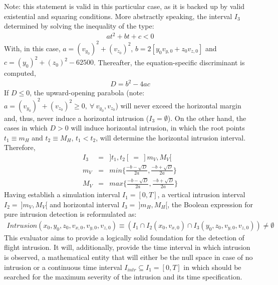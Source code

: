 \documentclass{article}
\begin{document}
\noindent
Note: this statement is valid in this particular case, as it is backed up by valid existential and squaring conditions. More abstractly speaking, the interval $I_3$ determined by solving the inequality of the type:
\begin{eqnarray*}
at^2 + bt+c<0
\end{eqnarray*}
\noindent
With, in this case, $a=(v_{y_0})^2+(v_{z_0})^2$, $b=2[y_0v_{y,0}+z_0 v_{z,0}]$ and $c=(y_0)^2 +(z_0)^2-62500$. Thereafter, the equation-specific discriminant is computed,
\begin{eqnarray*}
D = b^2-4ac
\end{eqnarray*}
\noindent
If $D\leq0$, the upward-opening parabola (note: $a=(v_{y_0})^2+(v_{z_0})^2\geq0, \ \forall \ v_{y_0},v_{z_0}$) will never exceed the horizontal margin and, thus, never induce a horizontal intrusion ($I_3 = \emptyset$). On the other hand, the cases in which $D>0$ will induce horizontal intrusion, in which the root points $t_1 \equiv m_H$ and $t_2 \equiv M_H$, $t_1<t_2$, will determine the horizontal intrusion interval. Therefore,
\begin{eqnarray*}
I_3 &=& ]t_1,t_2[ \ = \ ]m_V,M_V[ \\
m_V &=& min \{\frac{-b-\sqrt{D}}{2a},\frac{-b+\sqrt{D}}{2a}\} \\
M_V &=& max \{\frac{-b-\sqrt{D}}{2a},\frac{-b+\sqrt{D}}{2a}\}
\end{eqnarray*}
\noindent
Having establish a simulation interval $I_1 = [0,T]$, a vertical intrusion interval $I_2 = \ ]m_V,M_V[$ and horizontal interval $I_3 = \ ]m_H,M_H[$, the Boolean expression for pure intrusion detection is reformulated as:
\begin{eqnarray*}
Intrusion(x_0,y_0,z_0,v_{x,0},v_{y,0},v_{z,0}) \equiv (I_1\cap I_2(x_0,v_{x,0}) \cap I_3(y_0,z_0,v_{y,0},v_{z,0})) \not= \emptyset
\end{eqnarray*}
\noindent
This evaluator aims to provide a logically solid foundation for the detection of flight intrusion. It will, additionally, provide the time interval in which intrusion is observed, a mathematical entity that will either be the null space in case of no intrusion or a continuous time interval $I_{intr}\subseteq I_1= [0,T]$ in which should be searched for the maximum severity of the intrusion and its time specification. 
\end{document}
